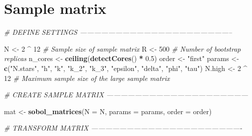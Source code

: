 \documentclass[11pt,]{article}
\newenvironment{Shaded}{\begin{snugshade}}{\end{snugshade}}
\newcommand{\CommentTok}[1]{\textcolor[rgb]{0.56,0.35,0.01}{\textit{#1}}}
\newcommand{\DataTypeTok}[1]{\textcolor[rgb]{0.13,0.29,0.53}{#1}}
\newcommand{\DecValTok}[1]{\textcolor[rgb]{0.00,0.00,0.81}{#1}}
\newcommand{\FloatTok}[1]{\textcolor[rgb]{0.00,0.00,0.81}{#1}}
\newcommand{\KeywordTok}[1]{\textcolor[rgb]{0.13,0.29,0.53}{\textbf{#1}}}
\newcommand{\NormalTok}[1]{#1}
\newcommand{\OperatorTok}[1]{\textcolor[rgb]{0.81,0.36,0.00}{\textbf{#1}}}
\newcommand{\StringTok}[1]{\textcolor[rgb]{0.31,0.60,0.02}{#1}}
\begin{document}
\hypertarget{sample-matrix}{%
\section{Sample matrix}\label{sample-matrix}}

\begin{Shaded}
\begin{Highlighting}[]
\CommentTok{# DEFINE SETTINGS -----------------------------------------------------------------}

\NormalTok{N <-}\StringTok{ }\DecValTok{2} \OperatorTok{^}\StringTok{ }\DecValTok{12} \CommentTok{# Sample size of sample matrix}
\NormalTok{R <-}\StringTok{ }\DecValTok{500} \CommentTok{# Number of bootstrap replicas}
\NormalTok{n_cores <-}\StringTok{ }\KeywordTok{ceiling}\NormalTok{(}\KeywordTok{detectCores}\NormalTok{() }\OperatorTok{*}\StringTok{ }\FloatTok{0.5}\NormalTok{)}
\NormalTok{order <-}\StringTok{ "first"}
\NormalTok{params <-}\StringTok{ }\KeywordTok{c}\NormalTok{(}\StringTok{"N.stars"}\NormalTok{, }\StringTok{"h"}\NormalTok{, }\StringTok{"k"}\NormalTok{, }\StringTok{"k_2"}\NormalTok{, }\StringTok{"k_3"}\NormalTok{, }\StringTok{"epsilon"}\NormalTok{, }\StringTok{"delta"}\NormalTok{, }\StringTok{"phi"}\NormalTok{, }\StringTok{"tau"}\NormalTok{) }
\NormalTok{N.high <-}\StringTok{ }\DecValTok{2} \OperatorTok{^}\StringTok{ }\DecValTok{12} \CommentTok{# Maximum sample size of the large sample matrix}

\CommentTok{# CREATE SAMPLE MATRIX ------------------------------------------------------------}

\NormalTok{mat <-}\StringTok{ }\KeywordTok{sobol_matrices}\NormalTok{(}\DataTypeTok{N =}\NormalTok{ N, }\DataTypeTok{params =}\NormalTok{ params, }\DataTypeTok{order =}\NormalTok{ order)}

\CommentTok{# TRANSFORM MATRIX ----------------------------------------------------------------}


\end{Highlighting}
\end{Shaded}
\end{document}
